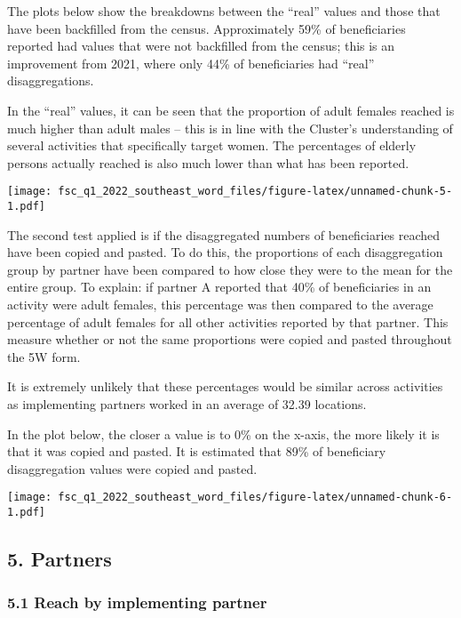 \documentclass[
]{article}
\begin{document}
The plots below show the breakdowns between the ``real'' values and
those that have been backfilled from the census. Approximately 59\% of
beneficiaries reported had values that were not backfilled from the
census; this is an improvement from 2021, where only 44\% of
beneficiaries had ``real'' disaggregations.

In the ``real'' values, it can be seen that the proportion of adult
females reached is much higher than adult males -- this is in line with
the Cluster's understanding of several activities that specifically
target women. The percentages of elderly persons actually reached is
also much lower than what has been reported.

\texttt{[image: fsc\_q1\_2022\_southeast\_word\_files/figure-latex/unnamed-chunk-5-1.pdf]}

The second test applied is if the disaggregated numbers of beneficiaries
reached have been copied and pasted. To do this, the proportions of each
disaggregation group by partner have been compared to how close they
were to the mean for the entire group. To explain: if partner A reported
that 40\% of beneficiaries in an activity were adult females, this
percentage was then compared to the average percentage of adult females
for all other activities reported by that partner. This measure whether
or not the same proportions were copied and pasted throughout the 5W
form.

It is extremely unlikely that these percentages would be similar across
activities as implementing partners worked in an average of 32.39
locations.

In the plot below, the closer a value is to 0\% on the x-axis, the more
likely it is that it was copied and pasted. It is estimated that 89\% of
beneficiary disaggregation values were copied and pasted.

\texttt{[image: fsc\_q1\_2022\_southeast\_word\_files/figure-latex/unnamed-chunk-6-1.pdf]}

\hypertarget{partners}{%
\subsection{5. Partners}\label{partners}}

\hypertarget{reach-by-implementing-partner}{%
\subsubsection{5.1 Reach by implementing
partner}\label{reach-by-implementing-partner}}
\end{document}
